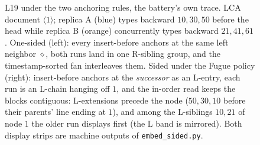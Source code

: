\documentclass[11pt]{article}
\newcommand{\code}[1]{\texttt{#1}}
\begin{document}
\begin{figure}[h]
\caption{L19 under the two anchoring rules, the battery's own trace.
LCA document $\langle 1\rangle$; replica A (blue) types backward
$10, 30, 50$ before the head while replica B (orange) concurrently
types backward $21, 41, 61$. One-sided (left): every insert-before
anchors at the same left neighbor $\diamond$, both runs land in one
R-sibling group, and the timestamp-sorted fan interleaves them. Sided
under the Fugue policy (right): insert-before anchors at the
\emph{successor} as an L-entry, each run is an L-chain hanging off
$1$, and the in-order read keeps the blocks contiguous: L-extensions
precede the node ($50, 30, 10$ before their parents' line ending at
$1$), and among the L-siblings $10, 21$ of node $1$ the older run
displays first (the L band is mirrored). Both display strips are
machine outputs of \code{embed\_sided.py}.}
\label{fig:sided-l19}
\end{figure}
\end{document}
